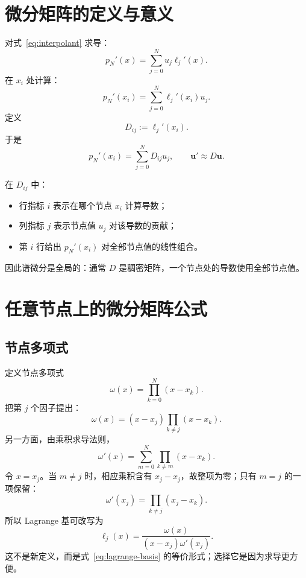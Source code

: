 \documentclass[11pt,a4paper]{ctexart}
\numberwithin{equation}{section}
\newcommand{\vect}[1]{\bm{#1}}
\begin{document}
\section{微分矩阵的定义与意义}

对式~\eqref{eq:interpolant} 求导：
\begin{equation}
  p_N'(x)=\sum_{j=0}^N u_j\ell_j'(x).
\end{equation}
在 $x_i$ 处计算：
\begin{equation}
  p_N'(x_i)=\sum_{j=0}^N \ell_j'(x_i)u_j.
\end{equation}
定义
\begin{equation}
  \boxed{D_{ij}:=\ell_j'(x_i)}.
  \label{eq:D-definition}
\end{equation}
于是
\begin{equation}
  \boxed{p_N'(x_i)=\sum_{j=0}^N D_{ij}u_j},
  \qquad
  \boxed{\vect{u}'\approx D\vect{u}}.
\end{equation}

在 $D_{ij}$ 中：
\begin{itemize}
  \item 行指标 $i$ 表示在哪个节点 $x_i$ 计算导数；
  \item 列指标 $j$ 表示节点值 $u_j$ 对该导数的贡献；
  \item 第 $i$ 行给出 $p_N'(x_i)$ 对全部节点值的线性组合。
\end{itemize}
因此谱微分是全局的：通常 $D$ 是稠密矩阵，一个节点处的导数使用全部节点值。

\section{任意节点上的微分矩阵公式}

\subsection{节点多项式}

定义节点多项式
\begin{equation}
  \omega(x)=\prod_{k=0}^N(x-x_k).
\end{equation}
把第 $j$ 个因子提出：
\begin{equation}
  \omega(x)=(x-x_j)\prod_{k\ne j}(x-x_k).
\end{equation}
另一方面，由乘积求导法则，
\begin{equation}
  \omega'(x)=\sum_{m=0}^N\prod_{k\ne m}(x-x_k).
\end{equation}
令 $x=x_j$。当 $m\ne j$ 时，相应乘积含有 $x_j-x_j$，故整项为零；只有 $m=j$ 的一项保留：
\begin{equation}
  \omega'(x_j)=\prod_{k\ne j}(x_j-x_k).
\end{equation}
所以 Lagrange 基可改写为
\begin{equation}
  \boxed{
  \ell_j(x)=\frac{\omega(x)}{(x-x_j)\omega'(x_j)}}.
  \label{eq:lagrange-omega}
\end{equation}
这不是新定义，而是式~\eqref{eq:lagrange-basis} 的等价形式；选择它是因为求导更方便。
\end{document}
